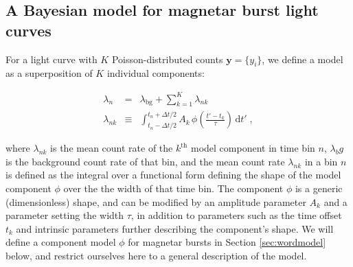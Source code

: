 \documentclass[12pt]{emulateapj}
\newcommand{\given}{\,|\,}
\newcommand{\dd}{\mathrm{d}}
\newcommand{\counts}{y}
\newcommand{\pars}{\theta}
\newcommand{\mean}{\lambda}
\newcommand{\Poisson}{{\mathcal P}}
\newcommand{\bg}{\mathrm{bg}}
\newcommand{\word}{\phi}
\begin{document}
\subsection{A Bayesian model for magnetar burst light curves}
\label{sec:model}

For a light curve with $K$ Poisson-distributed counts $\bm{\counts} = \{\counts_i\}$, we define a model as a superposition of $K$ individual components:

\begin{eqnarray}
\mean_n &=& \mean_{\bg} + \sum_{k=1}^K \mean_{nk}
\\
\mean_{nk} &\equiv& \int_{t_n-\Delta t/2}^{t_n+\Delta t/2} A_k\,\word(\frac{t'-t_k}{\tau})\,\dd t' \; ,
\end{eqnarray}

where $\mean_{nk}$ is the mean count rate of the $k^{\mathrm{th}}$ model component in time bin $n$, 
$\mean_bg$ is the background count rate of that bin,
and the mean count rate $\mean_{nk}$ in a bin $n$ is defined as the integral over a functional form defining the shape of
the model component $\word$ over the the width of that time bin. The component $\word$ is a generic (dimensionless) shape,
and can be modified by an amplitude parameter $A_k$ and a parameter setting the width $\tau$, in addition to
parameters such as the time offset $t_k$ and intrinsic parameters further describing the component's shape.
We will define a component model $\word$ for magnetar bursts in Section \ref{sec:wordmodel} below, and
restrict ourselves here to a general description of the model.
 
  
\end{document}
